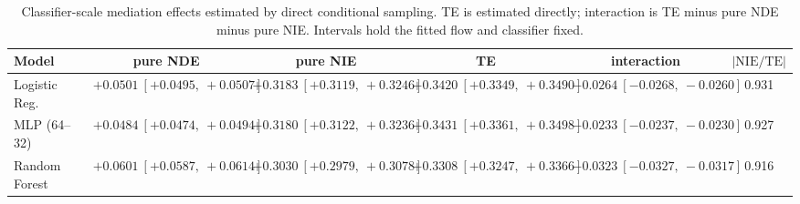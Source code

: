 \begin{table}[htbp]
  \centering
  \caption{Classifier-scale mediation effects estimated by direct conditional sampling. TE is estimated directly; interaction is TE minus pure NDE minus pure NIE. Intervals hold the fitted flow and classifier fixed.}
  \label{tab:german_synth_m2_gap_overall}
  \begin{tabular}{lccccc}
    \toprule
    Model & pure NDE & pure NIE & TE & interaction & $|\mathrm{NIE}/\mathrm{TE}|$ \\
    \midrule
    Logistic Reg. & $+0.0501\ [+0.0495,\ +0.0507]$ & $+0.3183\ [+0.3119,\ +0.3246]$ & $+0.3420\ [+0.3349,\ +0.3490]$ & $-0.0264\ [-0.0268,\ -0.0260]$ & 0.931 \\
    MLP (64--32) & $+0.0484\ [+0.0474,\ +0.0494]$ & $+0.3180\ [+0.3122,\ +0.3236]$ & $+0.3431\ [+0.3361,\ +0.3498]$ & $-0.0233\ [-0.0237,\ -0.0230]$ & 0.927 \\
    Random Forest & $+0.0601\ [+0.0587,\ +0.0614]$ & $+0.3030\ [+0.2979,\ +0.3078]$ & $+0.3308\ [+0.3247,\ +0.3366]$ & $-0.0323\ [-0.0327,\ -0.0317]$ & 0.916 \\
    \bottomrule
  \end{tabular}
\end{table}